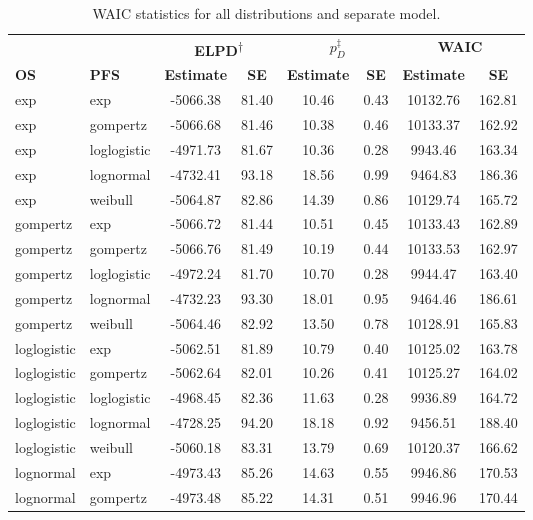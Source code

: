 \documentclass[AMA,STIX1COL]{WileyNJD-v2}
\begin{document}
\begin{table}[H]
\caption{WAIC statistics for all distributions and separate model. \label{tab:waic_separate}}
\centering
\begin{tabular}{l l c c c c c c}
\toprule
\multicolumn{1}{l}{} & \multicolumn{1}{l}{} & \multicolumn{2}{c}{\textbf{ELPD\textsuperscript{$\dagger$}}} & \multicolumn{2}{c}{\textbf{$p_D^{\ddagger}$}} & \multicolumn{2}{c}{\textbf{WAIC}} \\
\cmidrule{3-4}\cmidrule{5-6}\cmidrule{7-8}
\textbf{OS} & \textbf{PFS} & \textbf{Estimate} & \textbf{SE} & \textbf{Estimate} & \textbf{SE} & \textbf{Estimate} & \textbf{SE}\\
\midrule
exp & exp & -5066.38 & 81.40 & 10.46 & 0.43 & 10132.76 & 162.81\\
exp & gompertz & -5066.68 & 81.46 & 10.38 & 0.46 & 10133.37 & 162.92\\
exp & loglogistic & -4971.73 & 81.67 & 10.36 & 0.28 & 9943.46 & 163.34\\
exp & lognormal & -4732.41 & 93.18 & 18.56 & 0.99 & 9464.83 & 186.36\\
exp & weibull & -5064.87 & 82.86 & 14.39 & 0.86 & 10129.74 & 165.72\\
gompertz & exp & -5066.72 & 81.44 & 10.51 & 0.45 & 10133.43 & 162.89\\
gompertz & gompertz & -5066.76 & 81.49 & 10.19 & 0.44 & 10133.53 & 162.97\\
gompertz & loglogistic & -4972.24 & 81.70 & 10.70 & 0.28 & 9944.47 & 163.40\\
gompertz & lognormal & -4732.23 & 93.30 & 18.01 & 0.95 & 9464.46 & 186.61\\
gompertz & weibull & -5064.46 & 82.92 & 13.50 & 0.78 & 10128.91 & 165.83\\
loglogistic & exp & -5062.51 & 81.89 & 10.79 & 0.40 & 10125.02 & 163.78\\
loglogistic & gompertz & -5062.64 & 82.01 & 10.26 & 0.41 & 10125.27 & 164.02\\
loglogistic & loglogistic & -4968.45 & 82.36 & 11.63 & 0.28 & 9936.89 & 164.72\\
loglogistic & lognormal & -4728.25 & 94.20 & 18.18 & 0.92 & 9456.51 & 188.40\\
loglogistic & weibull & -5060.18 & 83.31 & 13.79 & 0.69 & 10120.37 & 166.62\\
lognormal & exp & -4973.43 & 85.26 & 14.63 & 0.55 & 9946.86 & 170.53\\
lognormal & gompertz & -4973.48 & 85.22 & 14.31 & 0.51 & 9946.96 & 170.44\\

\end{tabular}
\end{table}
\end{document}
